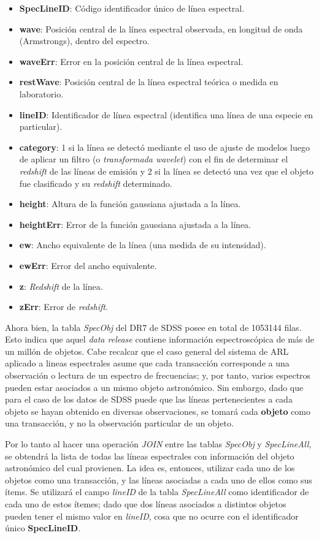 \begin{itemize}
\item \textbf{SpecLineID}: Código identificador único de línea espectral.
\item \textbf{wave}: Posición central de la línea espectral observada, en longitud de onda (Armstrongs), dentro del espectro.
\item \textbf{waveErr}: Error en la posición central de la línea espectral.
\item \textbf{restWave}: Posición central de la línea espectral teórica o medida en laboratorio.
\item \textbf{lineID}: Identificador de línea espectral (identifica una línea de una especie en particular).
\item \textbf{category}: 1 si la línea se detectó mediante el uso de ajuste de modelos luego de aplicar un filtro (o \textit{transformada wavelet}) con el fin de determinar el \textit{redshift} de las líneas de emisión y 2 si la línea se detectó una vez que el objeto fue clasificado y su \textit{redshift} determinado.
\item \textbf{height}: Altura de la función gaussiana ajustada a la línea.
\item \textbf{heightErr}: Error de la función gaussiana ajustada a la línea.
\item \textbf{ew}: Ancho equivalente de la línea (una medida de su intensidad).
\item \textbf{ewErr}: Error del ancho equivalente.
\item \textbf{z}: \textit{Redshift} de la línea.
\item \textbf{zErr}: Error de \textit{redshift}.
\end{itemize}

Ahora bien, la tabla \textit{SpecObj} del DR7 de SDSS posee en total de 1053144 filas. Esto indica que aquel \textit{data release} contiene información espectroscópica de más de un millón de objetos. Cabe recalcar que el caso general del sistema de ARL aplicado a lineas espectrales asume que cada transacción corresponde a una observación o lectura de un espectro de frecuencias; y, por tanto, varios espectros pueden estar asociados a un mismo objeto astronómico. Sin embargo, dado que para el caso de los datos de SDSS puede que las líneas pertenecientes a cada objeto se hayan obtenido en diversas observaciones, se tomará cada \textbf{objeto} como una transacción, y no la observación particular de un objeto.

Por lo tanto al hacer una operación \textit{JOIN} entre las tablas \textit{SpecObj} y \textit{SpecLineAll}, se obtendrá la lista de todas las líneas espectrales con información del objeto astronómico del cual provienen. La idea es, entonces, utilizar cada uno de los objetos como una transacción, y las líneas asociadas a cada uno de ellos como sus ítems. Se utilizará el campo \textit{lineID} de la tabla \textit{SpecLineAll} como identificador de cada uno de estos ítemes; dado que dos líneas asociados a distintos objetos pueden tener el mismo valor en \textit{lineID}, cosa que no ocurre con el identificador único \textbf{SpecLineID}. 

